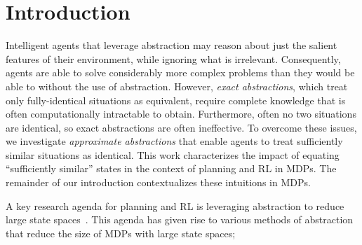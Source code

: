 \section{Introduction}
\label{sec:intro}

Intelligent agents that leverage abstraction may reason about just the salient features of their environment, while ignoring what is irrelevant. Consequently, agents are able to solve considerably more complex problems than they would be able to without the use of abstraction. However, \textit{exact abstractions}, which treat only fully-identical situations as equivalent, require complete knowledge that is often computationally intractable to obtain. Furthermore, often no two situations are identical, so exact abstractions are often ineffective. To overcome these issues, we investigate \textit{approximate abstractions} that enable agents to treat sufficiently similar situations as identical. This work characterizes the impact of equating ``sufficiently similar'' states in the context of planning and \ac{RL} in \acp{MDP}. The remainder of our introduction contextualizes these intuitions in \acp{MDP}.%


A key research agenda for planning and \ac{RL} is leveraging abstraction to reduce large state spaces~\cite{andre2002state,jong2005state,dietterich2000hierarchical,Bean2011}. This agenda has given rise to various methods of abstraction that reduce the size of \acp{MDP} with large state spaces; 

